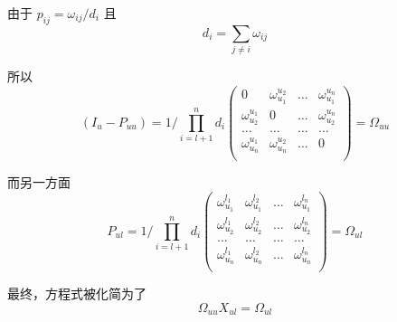 \documentclass[notheorems, UTF8]{beamer}
\theoremstyle{plain}
\begin{document}
\begin{frame}
由于 $p_{ij} = \omega_{ij} / d_i$ 且 
\begin{displaymath}
d_i = \sum_{j \neq i} \omega_{ij}
\end{displaymath}

所以
\begin{displaymath}
(I_u - P_{uu}) = 1 / \prod_{i = l + 1}^{n}d_i \left(
\begin{array}{cccc}
0 & \omega_{u_1}^{u_2} & \ldots & \omega_{u_1}^{u_n}  \\
\omega_{u_2}^{u_1} & 0 & \ldots & \omega_{u_2}^{u_n}  \\
\ldots & \ldots & \ldots & \ldots \\
\omega_{u_n}^{u_1} & \omega_{u_n}^{u_2} & \ldots & 0  \\
\end{array}
\right) = \Omega_{uu}
\end{displaymath}

而另一方面
\begin{displaymath}
P_{ul} = 1 / \prod_{i = l + 1}^{n}d_i \left(
\begin{array}{cccc}
\omega_{u_1}^{l_1} & \omega_{u_1}^{l_2} & \ldots & \omega_{u_1}^{l_n}  \\
\omega_{u_2}^{l_1} & \omega_{u_2}^{l_2} & \ldots & \omega_{u_2}^{l_n}  \\
\ldots & \ldots & \ldots & \ldots \\
\omega_{u_n}^{l_1} & \omega_{u_n}^{l_2} & \ldots & \omega_{u_n}^{l_n}  \\
\end{array}
\right) = \Omega_{ul}
\end{displaymath}

最终，方程式被化简为了
\begin{displaymath}
\Omega_{uu}X_{ul} = \Omega_{ul}
\end{displaymath}
\end{frame}
\end{document}
